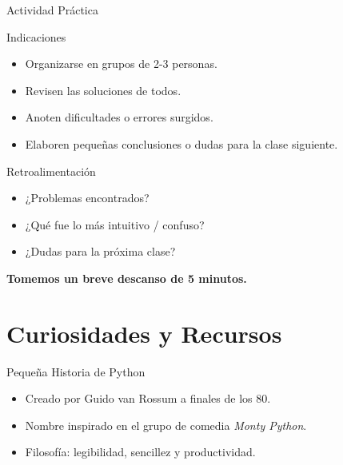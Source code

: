 \documentclass[10pt]{beamer}
\begin{document}
\begin{frame}{Actividad Práctica}
\begin{block}{Indicaciones}
  \begin{itemize}
    \item Organizarse en grupos de 2-3 personas.
    \item Revisen las soluciones de todos.
    \item Anoten dificultades o errores surgidos.
    \item Elaboren pequeñas conclusiones o dudas para la clase siguiente.
  \end{itemize}
\end{block}
\end{frame}

\begin{frame}{Retroalimentación}
  \begin{itemize}
    \item ¿Problemas encontrados?
    \item ¿Qué fue lo más intuitivo / confuso?
    \item ¿Dudas para la próxima clase?
  \end{itemize}
  \vspace{0.3cm}
  \textbf{Tomemos un breve descanso de 5 minutos.}
\end{frame}

\section{Curiosidades y Recursos}

\begin{frame}{Pequeña Historia de Python}
  \begin{itemize}
    \item Creado por Guido van Rossum a finales de los 80.
    \item Nombre inspirado en el grupo de comedia \emph{Monty Python}.
    \item Filosofía: legibilidad, sencillez y productividad.
  \end{itemize}
\end{frame}
\end{document}
